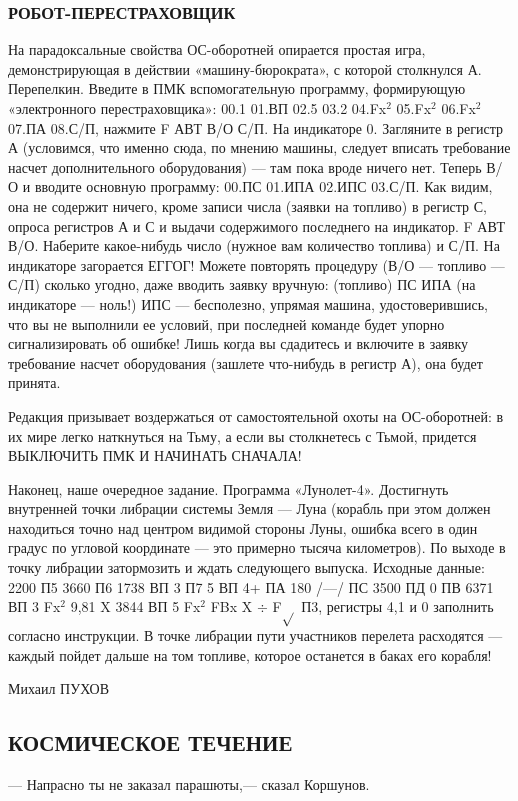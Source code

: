 \documentclass[11pt,a4paper,oneside]{article}
\begin{document}
\subsubsection{РОБОТ-ПЕРЕСТРАХОВЩИК}
На парадоксальные свойства ОС-оборотней опирается простая игра, демонстрирующая в действии «машину-бюрократа», с которой столкнулся А. Перепелкин. Введите в ПМК вспомогательную программу, формирующую «электронного перестраховщика»: 00.1 01.ВП 02.5 03.2 04.Fx$^{2}$ 05.Fx$^{2}$ 06.Fx$^{2}$ 07.ПА 08.С/П, нажмите F АВТ В/О С/П. На индикаторе 0. Загляните в регистр А (условимся, что именно сюда, по мнению машины, следует вписать требование насчет дополнительного оборудования) — там пока вроде ничего нет. Теперь В/О и вводите основную программу: 00.ПС 01.ИПА 02.ИПС 03.С/П. Как видим, она не содержит ничего, кроме записи числа (заявки на топливо) в регистр С, опроса регистров А и С и выдачи содержимого последнего на индикатор. F АВТ В/О. Наберите какое-нибудь число (нужное вам количество топлива) и С/П. На индикаторе загорается ЕГГОГ! Можете повторять процедуру (В/О — топливо — С/П) сколько угодно, даже вводить заявку вручную: (топливо) ПС ИПА (на индикаторе — ноль!) ИПС — бесполезно, упрямая машина, удостоверившись, что вы не выполнили ее условий, при последней команде будет упорно сигнализировать об ошибке! Лишь когда вы сдадитесь и включите в заявку требование насчет оборудования (зашлете что-нибудь в регистр А), она будет принята.

Редакция призывает воздержаться от самостоятельной охоты на ОС-оборотней: в их мире легко наткнуться на Тьму, а если вы столкнетесь с Тьмой, придется ВЫКЛЮЧИТЬ ПМК И НАЧИНАТЬ СНАЧАЛА!

Наконец, наше очередное задание. Программа «Лунолет-4». Достигнуть внутренней точки либрации системы Земля — Луна (корабль при этом должен находиться точно над центром видимой стороны Луны, ошибка всего в один градус по угловой координате — это примерно тысяча километров). По выходе в точку либрации затормозить и ждать следующего выпуска. Исходные данные: 2200 П5 3660 П6 1738 ВП 3 П7 5 ВП 4+ ПА 180 /—/ ПС 3500 ПД 0 ПВ 6371 ВП 3 Fx$^{2}$ 9,81 X 3844 ВП 5 Fx$^{2}$ FBx X $\div$ F$\sqrt{}$ П3, регистры 4,1 и 0 заполнить согласно инструкции. В точке либрации пути участников перелета расходятся — каждый пойдет дальше на том топливе, которое останется в баках его корабля!

Михаил ПУХОВ

\subsection{КОСМИЧЕСКОЕ ТЕЧЕНИЕ}
— Напрасно ты не заказал парашюты,— сказал Коршунов.
\end{document}
